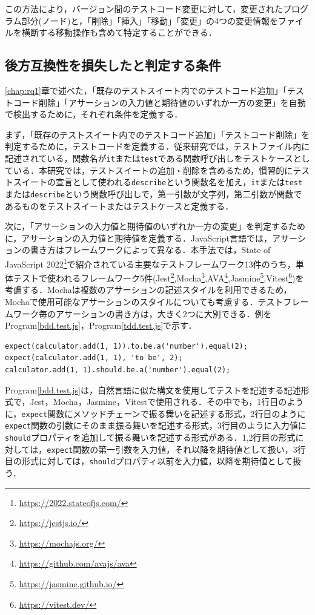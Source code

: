 \documentclass[11pt,dvipdfmx]{jreport}
\begin{document}
この方法により，バージョン間のテストコード変更に対して，変更されたプログラム部分(ノード)と，「削除」「挿入」「移動」「変更」の4つの変更情報をファイルを横断する移動操作も含めて特定することができる．

\subsection{後方互換性を損失したと判定する条件}\label{subsec:rq2.jouken}
\ref{chap:rq1}章で述べた，「既存のテストスイート内でのテストコード追加」「テストコード削除」「アサーションの入力値と期待値のいずれか一方の変更」を自動で検出するために，それぞれ条件を定義する．

まず，「既存のテストスイート内でのテストコード追加」「テストコード削除」を判定するために，テストコードを定義する．従来研究\cite{matsuda}では，テストファイル内に記述されている，関数名が{\verb|it|}または{\verb|test|}である関数呼び出しをテストケースとしている．本研究では，テストスイートの追加・削除を含めるため，慣習的にテストスイートの宣言として使われる{\verb|describe|}という関数名を加え，{\verb|it|}または{\verb|test|}または{\verb|describe|}という関数呼び出しで，第一引数が文字列，第二引数が関数であるものをテストスイートまたはテストケースと定義する．

次に，「アサーションの入力値と期待値のいずれか一方の変更」を判定するために，アサーションの入力値と期待値を定義する．JavaScript言語では，アサーションの書き方はフレームワークによって異なる．本手法では，State of JavaScript 2022\footnote{\url{https://2022.stateofjs.com/}}で紹介されている主要なテストフレームワーク13件のうち，単体テストで使われるフレームワーク5件(Jest\footnote{\url{https://jestjs.io/}},Mocha\footnote{\url{https://mochajs.org/}},AVA\footnote{\url{https://github.com/avajs/ava}},Jasmine\footnote{\url{https://jasmine.github.io/}},Vitest\footnote{\url{https://vitest.dev/}})を考慮する．Mochaは複数のアサーションの記述スタイルを利用できるため，Mochaで使用可能なアサーションのスタイルについても考慮する．テストフレームワーク毎のアサーションの書き方は，大きく2つに大別できる．例をProgram\ref{bdd.test.js}，Program\ref{tdd.test.js}で示す．

\begin{lstlisting}[caption=アサーション例1, label=bdd.test.js]
expect(calculator.add(1, 1)).to.be.a('number').equal(2);
expect(calculator.add(1, 1), 'to be', 2);
calculator.add(1, 1).should.be.a('number').equal(2);
\end{lstlisting}

Program\ref{bdd.test.js}は，自然言語に似た構文を使用してテストを記述する記述形式で，Jest，Mocha，Jasmine，Vitestで使用される．その中でも，1行目のように，{\verb|expect|}関数にメソッドチェーンで振る舞いを記述する形式，2行目のように{\verb|expect|}関数の引数にそのまま振る舞いを記述する形式，3行目のように入力値に{\verb|should|}プロパティを追加して振る舞いを記述する形式がある．1,2行目の形式に対しては，{\verb|expect|}関数の第一引数を入力値，それ以降を期待値として扱い，3行目の形式に対しては，{\verb|should|}プロパティ以前を入力値，以降を期待値として扱う．
\end{document}
